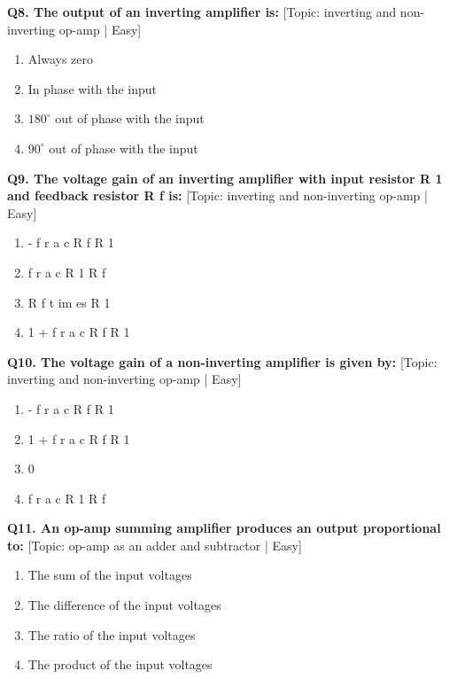 \noindent\textbf{Q8. The output of an inverting amplifier is:} \hfill [Topic: inverting and non-inverting op-amp | Easy]
\begin{enumerate}[label=(\alph*),topsep=2pt,itemsep=1pt,partopsep=0pt,parsep=0pt]
    \item {Always zero}
    \item {In phase with the input}
    \item {$180^\circ$ out of phase with the input}
    \item {$90^\circ$ out of phase with the input}
\end{enumerate}
\vspace{2mm}

\noindent\textbf{Q9. The voltage gain of an inverting amplifier with input resistor R 1 and feedback resistor R f is:} \hfill [Topic: inverting and non-inverting op-amp | Easy]
\begin{enumerate}[label=(\alph*),topsep=2pt,itemsep=1pt,partopsep=0pt,parsep=0pt]
    \item {- f r a c R f R 1}
    \item {f r a c R 1 R f}
    \item {R f t im es R 1}
    \item {1 + f r a c R f R 1}
\end{enumerate}
\vspace{2mm}

\noindent\textbf{Q10. The voltage gain of a non-inverting amplifier is given by:} \hfill [Topic: inverting and non-inverting op-amp | Easy]
\begin{enumerate}[label=(\alph*),topsep=2pt,itemsep=1pt,partopsep=0pt,parsep=0pt]
    \item {- f r a c R f R 1}
    \item {1 + f r a c R f R 1}
    \item {0}
    \item {f r a c R 1 R f}
\end{enumerate}
\vspace{2mm}

\noindent\textbf{Q11. An op-amp summing amplifier produces an output proportional to:} \hfill [Topic: op-amp as an adder and subtractor | Easy]
\begin{enumerate}[label=(\alph*),topsep=2pt,itemsep=1pt,partopsep=0pt,parsep=0pt]
    \item {The sum of the input voltages}
    \item {The difference of the input voltages}
    \item {The ratio of the input voltages}
    \item {The product of the input voltages}
\end{enumerate}
\vspace{2mm}

